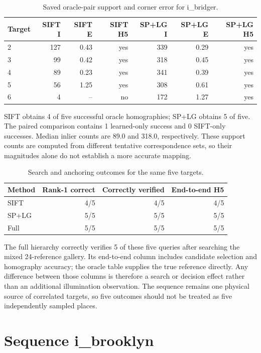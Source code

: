 \begin{table}[H]\centering\small
\caption{Saved oracle-pair support and corner error for i\_bridger.}\label{tab:hp-pairs-5}
\begin{tabular}{lrrrrrr}\toprule
Target & SIFT I & SIFT E & SIFT H5 & SP+LG I & SP+LG E & SP+LG H5 \\
\midrule
2 & 127 & 0.43 & yes & 339 & 0.29 & yes \\
3 & 99 & 0.42 & yes & 318 & 0.45 & yes \\
4 & 89 & 0.23 & yes & 341 & 0.39 & yes \\
5 & 56 & 1.25 & yes & 308 & 0.61 & yes \\
6 & 4 & -- & no & 172 & 1.27 & yes \\
\bottomrule\end{tabular}\end{table}


SIFT obtains 4 of five successful oracle homographies; SP+LG obtains 5 of five. The paired comparison contains 1 learned-only success and 0 SIFT-only successes. Median inlier counts are 89.0 and 318.0, respectively. These support counts are computed from different tentative correspondence sets, so their magnitudes alone do not establish a more accurate mapping.

\begin{table}[H]\centering\small
\caption{Search and anchoring outcomes for the same five targets.}\label{tab:hp-end-5}
\begin{tabular}{lrrr}\toprule
Method & Rank-1 correct & Correctly verified & End-to-end H5 \\
\midrule
SIFT & 4/5 & 4/5 & 4/5 \\
SP+LG & 5/5 & 5/5 & 5/5 \\
Full & 5/5 & 5/5 & 5/5 \\
\bottomrule\end{tabular}\end{table}


The full hierarchy correctly verifies 5 of these five queries after searching the mixed 24-reference gallery. Its end-to-end column includes candidate selection and homography accuracy; the oracle table supplies the true reference directly. Any difference between those columns is therefore a search or decision effect rather than an additional illumination observation. The sequence remains one physical source of correlated targets, so five outcomes should not be treated as five independently sampled places.

\section{Sequence i\_brooklyn}

